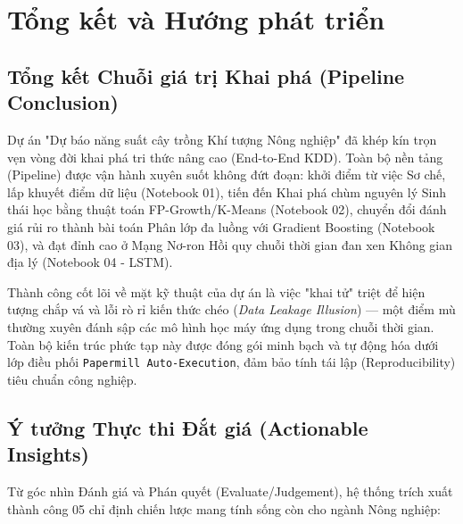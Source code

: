 \chapter{Tổng kết và Hướng phát triển}

\section{Tổng kết Chuỗi giá trị Khai phá (Pipeline Conclusion)}

Dự án "Dự báo năng suất cây trồng Khí tượng Nông nghiệp" đã khép kín trọn vẹn vòng đời khai phá tri thức nâng cao (End-to-End KDD). Toàn bộ nền tảng (Pipeline) được vận hành xuyên suốt không đứt đoạn: khởi điểm từ việc Sơ chế, lấp khuyết điểm dữ liệu (Notebook 01), tiến đến Khai phá chùm nguyên lý Sinh thái học bằng thuật toán FP-Growth/K-Means (Notebook 02), chuyển đổi đánh giá rủi ro thành bài toán Phân lớp đa luồng với Gradient Boosting (Notebook 03), và đạt đỉnh cao ở Mạng Nơ-ron Hồi quy chuỗi thời gian đan xen Không gian địa lý (Notebook 04 - LSTM).

Thành công cốt lõi về mặt kỹ thuật của dự án là việc "khai tử" triệt để hiện tượng chắp vá và lỗi rò rỉ kiến thức chéo (\textit{Data Leakage Illusion}) — một điểm mù thường xuyên đánh sập các mô hình học máy ứng dụng trong chuỗi thời gian. Toàn bộ kiến trúc phức tạp này được đóng gói minh bạch và tự động hóa dưới lớp điều phối \texttt{Papermill Auto-Execution}, đảm bảo tính tái lập (Reproducibility) tiêu chuẩn công nghiệp.

\section{Ý tưởng Thực thi Đắt giá (Actionable Insights)}

Từ góc nhìn Đánh giá và Phán quyết (Evaluate/Judgement), hệ thống trích xuất thành công 05 chỉ định chiến lược mang tính sống còn cho ngành Nông nghiệp:

